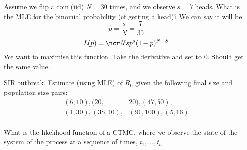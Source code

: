 \documentclass{/home/janmebows/Documents/LatexTemplates/myassignment}
\begin{document}
Assume we flip a coin (iid) $N=30$ times, and we observe $s=7$ heads. What is the MLE for the binomial probability (of getting a head)?
We can say it will be
\[\hat{p} = \frac s N = \frac7{30}\]
\begin{align*}
    L(p) = \ncr Ns p^s (1-p)^{N-S}\\    
\end{align*}
We want to maximise this function. Take the derivative and set to $0$. Should get the same value.


SIR outbreak. Estimate (using MLE) of $R_0$ given the following final size and population size pairs:
\begin{align*}
    (6,10), (20,&20), (47,50),\\
    (1,30), (38,40), & (90,100), (5,16)\\
\end{align*}




What is the likelihood function of a CTMC, where we observe the state of the system of the process at a sequence of times, $t_1,\ldots,t_n$
\end{document}

